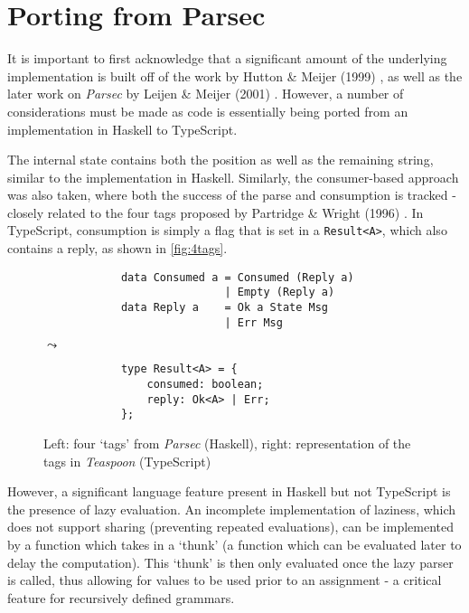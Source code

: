 \section{Porting from Parsec}
\label{sec:port}

It is important to first acknowledge that a significant amount of the underlying implementation is built off of the work by Hutton \& Meijer (1999) \cite{hutton99}, as well as the later work on \textit{Parsec} by Leijen \& Meijer (2001) \cite{leijen01}.
However, a number of considerations must be made as code is essentially being ported from an implementation in Haskell to TypeScript.

The internal state contains both the position as well as the remaining string, similar to the implementation in Haskell.
Similarly, the consumer-based approach was also taken, where both the success of the parse and consumption is tracked - closely related to the four tags proposed by Partridge \& Wright (1996) \cite{partridge96}.
In TypeScript, consumption is simply a flag that is set in a \texttt{Result<A>}, which also contains a reply, as shown in \autoref{fig:4tags}.

\begin{figure}[H]
    \centering
    \begin{minipage}{0.525\textwidth}
        \begin{verbatim}
            data Consumed a = Consumed (Reply a)
                            | Empty (Reply a)
            data Reply a    = Ok a State Msg
                            | Err Msg
        \end{verbatim}
    \end{minipage}
    \hfill
    $\leadsto$
    \hfill
    \begin{minipage}{0.35\textwidth}
        \begin{verbatim}
            type Result<A> = {
                consumed: boolean;
                reply: Ok<A> | Err;
            };
        \end{verbatim}
    \end{minipage}
    \caption{Left: four `tags' from \textit{Parsec} (Haskell), right: representation of the tags in \textit{Teaspoon} (TypeScript)}
    \label{fig:4tags}
\end{figure}

However, a significant language feature present in Haskell but not TypeScript is the presence of lazy evaluation.
An incomplete implementation of laziness, which does not support sharing (preventing repeated evaluations), can be implemented by a function which takes in a `thunk' (a function which can be evaluated later to delay the computation).
This `thunk' is then only evaluated once the lazy parser is called, thus allowing for values to be used prior to an assignment - a critical feature for recursively defined grammars.

